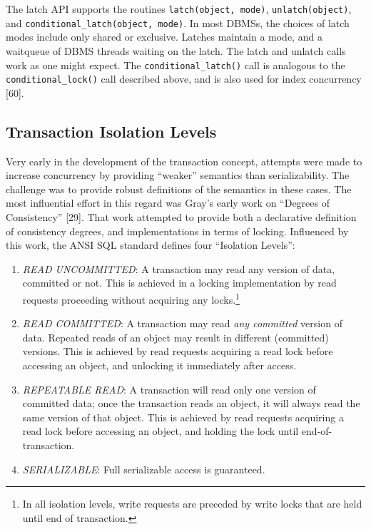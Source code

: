 \documentclass[a4paper,11pt,twoside,openright]{book}
\begin{document}
The latch API supports the routines \texttt{latch(object, mode)},
\texttt{unlatch(object)}, and \texttt{conditional\_latch(object, mode)}. In most DBMSs, the
choices of latch modes include only shared or exclusive. Latches
maintain a mode, and a waitqueue of DBMS threads waiting on the latch.
The latch and unlatch calls work as one might expect. The
\texttt{conditional\_latch()} call is analogous to the \texttt{conditional\_lock()}
call described above, and is also used for index concurrency {[}60{]}.

\hypertarget{transaction-isolation-levels}{%
\subsection{Transaction Isolation
Levels}\label{transaction-isolation-levels}}

Very early in the development of the transaction concept, attempts were
made to increase concurrency by providing ``weaker'' semantics than
serializability. The challenge was to provide robust definitions of the
semantics in these cases. The most influential effort in this regard was
Gray's early work on ``Degrees of Consistency'' {[}29{]}. That work
attempted to provide both a declarative definition of consistency
degrees, and implementations in terms of locking. Influenced by this
work, the ANSI SQL standard defines four ``Isolation Levels'':

\begin{enumerate}
\def\labelenumi{\arabic{enumi}.}

\item
  \emph{READ UNCOMMITTED}: A transaction may read any version of data,
  committed or not. This is achieved in a locking
implementation by read requests proceeding without acquiring any
locks.\footnote{In all isolation levels, write requests are preceded by write locks
that are held until end of transaction.}

\item
  \emph{READ COMMITTED}: A transaction may read \emph{any committed}
  version of data. Repeated reads of an object may result in different
  (committed) versions. This is achieved by read requests acquiring a
  read lock before accessing an object, and unlocking it immediately
  after access.
\item
  \emph{REPEATABLE READ}: A transaction will read only one version of
  committed data; once the transaction reads an object, it will always
  read the same version of that object. This is achieved by read
  requests acquiring a read lock before accessing an object, and holding
  the lock until end-of-transaction.
\item
  \emph{SERIALIZABLE}: Full serializable access is guaranteed.
\end{enumerate}
\end{document}
